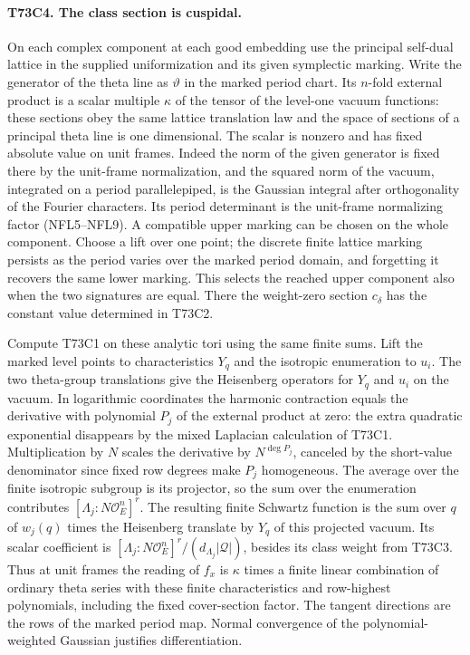 \paragraph{T73C4. The class section is cuspidal.}
On each complex component at each good embedding use the principal
self-dual lattice in the supplied uniformization and its given
symplectic marking. Write the generator of the theta line as
$\vartheta$ in the marked period chart. Its $n$-fold external
product is a scalar multiple $\kappa$ of the tensor of the
level-one vacuum functions: these sections obey the same
lattice translation law and the space of sections of a principal
theta line is one dimensional. The scalar is nonzero and has
fixed absolute value on unit frames. Indeed the norm of the
given generator is fixed there by the unit-frame normalization,
and the squared norm of the vacuum, integrated on a period
parallelepiped, is the Gaussian integral after orthogonality
of the Fourier characters. Its period determinant is the
unit-frame normalizing factor (NFL5--NFL9).
A compatible upper marking can be chosen on the whole component.
Choose a lift over one point; the discrete finite lattice
marking persists as the period varies over the marked period
domain, and forgetting it recovers the same lower marking.
This selects the reached upper component also when the two
signatures are equal. There the weight-zero section $c_\delta$
has the constant value determined in T73C2.

Compute T73C1 on these analytic tori using
the same finite sums. Lift the marked level points to
characteristics $Y_q$ and the isotropic enumeration to $u_i$.
The two theta-group translations give the Heisenberg
operators for $Y_q$ and $u_i$ on the vacuum. In logarithmic
coordinates the harmonic contraction equals the derivative with
polynomial $P_j$ of the external product at zero: the extra
quadratic exponential disappears by the mixed Laplacian
calculation of T73C1. Multiplication by $N$ scales the
derivative by $N^{\deg P_j}$, canceled by the short-value
denominator since fixed row degrees make $P_j$ homogeneous.
The average over the finite isotropic subgroup is its projector,
so the sum over the enumeration contributes
$[\Lambda_j:N\mathcal O_E^n]^r$. The resulting finite Schwartz
function is the sum over $q$ of $w_j(q)$ times the Heisenberg
translate by $Y_q$ of this projected vacuum. Its scalar coefficient
is $[\Lambda_j:N\mathcal O_E^n]^r/(d_{\Lambda_j}|\mathcal Q|)$,
besides its class weight from T73C3. Thus at unit frames the
reading of $f_x$ is $\kappa$ times a finite linear combination
of ordinary theta series with these finite characteristics and
row-highest polynomials, including the fixed cover-section
factor. The tangent directions are the rows of the marked
period map. Normal convergence of the polynomial-weighted
Gaussian justifies differentiation.

